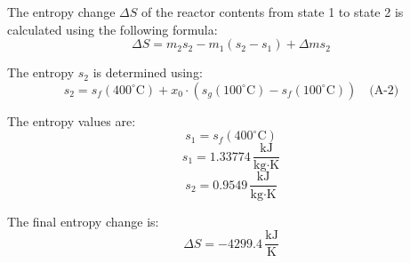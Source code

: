 The entropy change \( \Delta S \) of the reactor contents from state 1 to state 2 is calculated using the following formula:  
\[
\Delta S = m_2 s_2 - m_1 (s_2 - s_1) + \Delta m s_2
\]  

The entropy \( s_2 \) is determined using:  
\[
s_2 = s_f(400^\circ\text{C}) + x_0 \cdot \left( s_g(100^\circ\text{C}) - s_f(100^\circ\text{C}) \right) \quad \text{(A-2)}
\]  

The entropy values are:  
\[
s_1 = s_f(400^\circ\text{C})
\]  
\[
s_1 = 1.33774 \, \frac{\text{kJ}}{\text{kg·K}}
\]  
\[
s_2 = 0.9549 \, \frac{\text{kJ}}{\text{kg·K}}
\]  

The final entropy change is:  
\[
\Delta S = -4299.4 \, \frac{\text{kJ}}{\text{K}}
\]